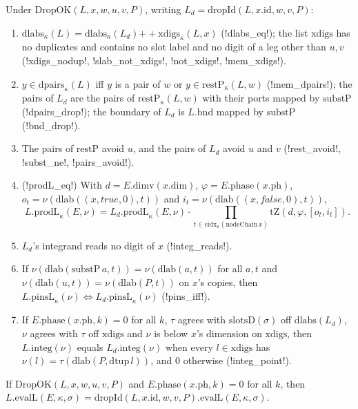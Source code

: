 \begin{proposition}
Under $\mathrm{DropOK}(L,x,w,u,v,P)$, writing $L_d=\mathrm{dropId}(L,x.\mathrm{id},w,v,P)$:
\begin{enumerate}
\item $\mathrm{dlabs}_\kappa(L)=\mathrm{dlabs}_\kappa(L_d)\mathbin{+\!\!+}\mathrm{xdigs}_\kappa(L,x)$ (\lean!dlabs_eq!); the list $\mathrm{xdigs}$ has no duplicates and contains no slot label and no digit of a leg other than $u,v$ (\lean!xdigs_nodup!, \lean!slab_not_xdigs!, \lean!not_xdigs!, \lean!mem_xdigs!).
\item $y\in\mathrm{dpairs}_\kappa(L)$ iff $y$ is a pair of $w$ or $y\in\mathrm{restP}_\kappa(L,w)$ (\lean!mem_dpairs!); the pairs of $L_d$ are the pairs of $\mathrm{restP}_\kappa(L,w)$ with their ports mapped by $\mathrm{substP}$ (\lean!dpairs_drop!); the boundary of $L_d$ is $L.\mathrm{bnd}$ mapped by $\mathrm{substP}$ (\lean!bnd_drop!).
\item The pairs of $\mathrm{restP}$ avoid $u$, and the pairs of $L_d$ avoid $u$ and $v$ (\lean!rest_avoid!, \lean!subst_ne!, \lean!pairs_avoid!).
\item (\lean!prodL_eq!) With $d=E.\mathrm{dimv}(x.\mathrm{dim})$, $\varphi=E.\mathrm{phase}(x.\mathrm{ph})$, $o_t=\nu(\mathrm{dlab}((x,\mathit{true},0),t))$ and $i_t=\nu(\mathrm{dlab}((x,\mathit{false},0),t))$,
\[
L.\mathrm{prodL}_\kappa(E,\nu)=L_d.\mathrm{prodL}_\kappa(E,\nu)\cdot\prod_{t\in\mathrm{cidx}_\kappa(\mathrm{nodeChain}\,x)}\mathrm{tZ}(d,\varphi,[o_t,i_t]).
\]
\item $L_d$'s integrand reads no digit of $x$ (\lean!integ_reads!).
\item If $\nu(\mathrm{dlab}(\mathrm{substP}\,a,t))=\nu(\mathrm{dlab}(a,t))$ for all $a,t$ and $\nu(\mathrm{dlab}(u,t))=\nu(\mathrm{dlab}(P,t))$ on $x$'s copies, then $L.\mathrm{pinsL}_\kappa(\nu)\iff L_d.\mathrm{pinsL}_\kappa(\nu)$ (\lean!pins_iff!).
\item If $E.\mathrm{phase}(x.\mathrm{ph},k)=0$ for all $k$, $\tau$ agrees with $\mathrm{slotsD}(\sigma)$ off $\mathrm{dlabs}(L_d)$, $\nu$ agrees with $\tau$ off $\mathrm{xdigs}$ and $\nu$ is below $x$'s dimension on $\mathrm{xdigs}$, then $L.\mathrm{integ}(\nu)$ equals $L_d.\mathrm{integ}(\nu)$ when every $l\in\mathrm{xdigs}$ has $\nu(l)=\tau(\mathrm{dlab}(P,\mathrm{dtup}\,l))$, and $0$ otherwise (\lean!integ_point!).
\end{enumerate}
\end{proposition}

\begin{theorem}\label{thm:lean-sym-drop}
If $\mathrm{DropOK}(L,x,w,u,v,P)$ and $E.\mathrm{phase}(x.\mathrm{ph},k)=0$ for all $k$, then $L.\mathrm{evalL}(E,\kappa,\sigma)=\mathrm{dropId}(L,x.\mathrm{id},w,v,P).\mathrm{evalL}(E,\kappa,\sigma)$.
\end{theorem}

